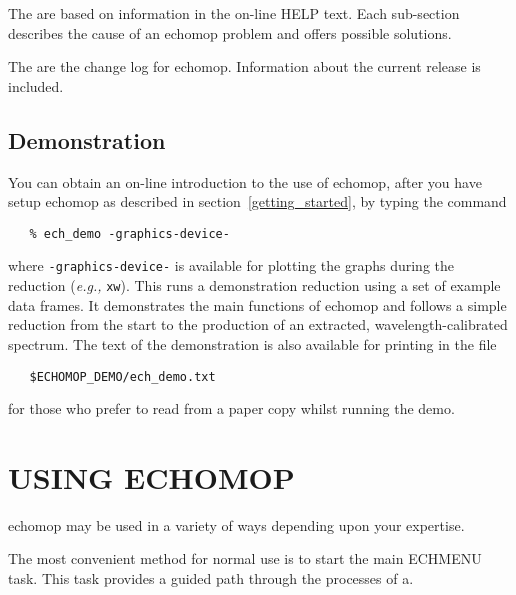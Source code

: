 {The  are}
based on information in the on-line HELP text.
Each sub-section describes the cause of an {\sc echomop} problem and offers
possible solutions.

{The  are} the change log for
{\sc echomop}.  Information about the current release is included.

\subsection{Demonstration}

You can obtain an on-line introduction to the use of {\sc echomop},
after you have setup {\sc echomop} as described in
section~\ref{getting_started}, by typing the command

\begin{verbatim}
   % ech_demo -graphics-device-
\end{verbatim}

where {\tt -graphics-device-} is available for plotting the graphs
during the reduction ({\it{e.g.,}} \verb+xw+). 
This runs a demonstration reduction using a set of example data
frames.  It demonstrates the main functions of {\sc echomop} and follows
a simple reduction from the start to the production of an extracted,
wavelength-calibrated spectrum.  The text of the demonstration is also
available for printing in the file

\begin{verbatim}
   $ECHOMOP_DEMO/ech_demo.txt
\end{verbatim}

for those who prefer to read from a paper copy whilst running the demo.


\section{USING ECHOMOP}

{\sc echomop} may be used in a variety of ways depending upon your expertise.

The most convenient method for normal use is to start the main ECHMENU
task.
This task provides a guided path through the processes of a.

